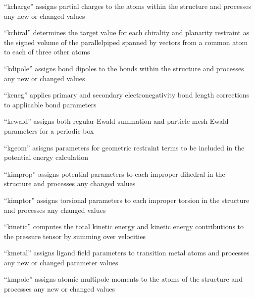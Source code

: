 \documentclass[letterpaper,11pt,english]{sphinxmanual}
\begin{document}
“kcharge” assigns partial charges to the atoms within the structure and processes any new or changed values


“kchiral” determines the target value for each chirality and planarity restraint as the signed volume of the parallelpiped spanned by vectors from a common atom to each of three other atoms


“kdipole” assigns bond dipoles to the bonds within the structure and processes any new or changed values


“keneg” applies primary and secondary electronegativity bond length corrections to applicable bond parameters


“kewald” assigns both regular Ewald summation and particle mesh Ewald parameters for a periodic box


“kgeom” asisgns parameters for geometric restraint terms to be included in the potential energy calculation


“kimprop” assigns potential parameters to each improper dihedral in the structure and processes any changed values


“kimptor” assigns torsional parameters to each improper torsion in the structure and processes any changed values


“kinetic” computes the total kinetic energy and kinetic energy contributions to the pressure tensor by summing over velocities


“kmetal” assigns ligand field parameters to transition metal atoms and processes any new or changed parameter values


“kmpole” assigns atomic multipole moments to the atoms of the structure and processes any new or changed values

\end{document}
